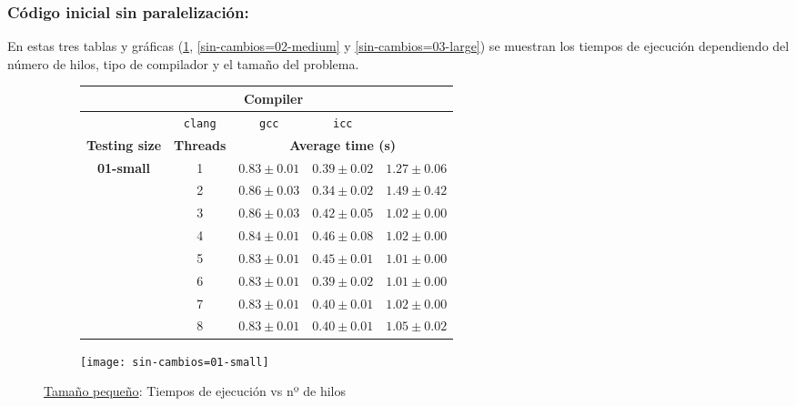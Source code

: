 
\subsubsection{\textbf{Código inicial sin paralelización:}}

\par En estas tres tablas y gráficas (\ref{fig:sin-cambios=01-small}, \ref{sin-cambios=02-medium} y \ref{sin-cambios=03-large}) se muestran los tiempos de ejecución dependiendo del número de hilos,
 tipo de compilador y el tamaño del problema.


\begin{figure}[H]
    \centering
    \begin{subfigure}{0.4\textwidth}
        \begin{adjustbox}{width=\textwidth} 
        \begin{tabular}{|c|c|c|c|c|}
            \hline
            \rowcolor{azul} \multicolumn{2}{|c|}{}&\multicolumn{3}{c|}{\textbf{Compiler}} \\ \hline
            \rowcolor{azul} \multicolumn{2}{|c|}{}&\texttt{clang}&\texttt{gcc}&\texttt{icc}\\ \hline
            \rowcolor{azul} \textbf{Testing size} & \textbf{Threads}&\multicolumn{3}{c|}{\textbf{Average time (s)}} \\ \hline
            \multirow{8}{1cm}{\textbf{01-small}} & 1 & \(0.83\pm{0.01}\) & \(0.39\pm{0.02}\) & \(1.27\pm{0.06}\) \\ \cline{2-5}
            & 2 & \(0.86\pm{0.03}\) & \(0.34\pm{0.02}\) & \(1.49\pm{0.42}\) \\ \cline{2-5}
            & 3 & \(0.86\pm{0.03}\) & \(0.42\pm{0.05}\) & \(1.02\pm{0.00}\) \\ \cline{2-5}
            & 4 & \(0.84\pm{0.01}\) & \(0.46\pm{0.08}\) & \(1.02\pm{0.00}\) \\ \cline{2-5}
            & 5 & \(0.83\pm{0.01}\) & \(0.45\pm{0.01}\) & \(1.01\pm{0.00}\) \\ \cline{2-5}
            & 6 & \(0.83\pm{0.01}\) & \(0.39\pm{0.02}\) & \(1.01\pm{0.00}\) \\ \cline{2-5}
            & 7 & \(0.83\pm{0.01}\) & \(0.40\pm{0.01}\) & \(1.02\pm{0.00}\) \\ \cline{2-5}
            & 8 & \(0.83\pm{0.01}\) & \(0.40\pm{0.01}\) & \(1.05\pm{0.02}\) \\ \hline
        \end{tabular}
        \end{adjustbox}
    \end{subfigure}
    \hfill
    \begin{subfigure}{0.5\textwidth}
        \texttt{[image: sin-cambios=01-small]}
    \end{subfigure}
    \caption{\underline{Tamaño pequeño}: Tiempos de ejecución vs nº de hilos}
    \label{fig:sin-cambios=01-small}
\end{figure}

